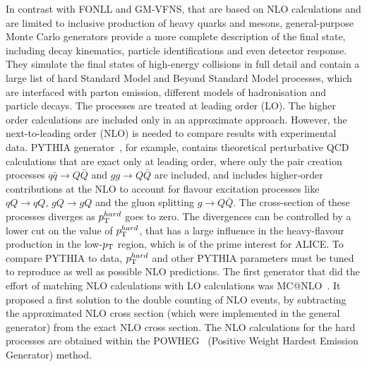 In contrast with FONLL and GM-VFNS, that are based on NLO calculations and are limited to inclusive production
of heavy quarks and mesons, general-purpose Monte Carlo generators provide a more complete description 
of the final state, including decay kinematics, particle identifications and even detector response. They simulate the 
final states of high-energy collisions in full detail and contain a large list of hard Standard Model and Beyond Standard Model processes, which are interfaced with parton emission, different models of hadronisation and particle decays. 
The processes are treated at leading order (LO). The higher order calculations are included only in an
approximate approach. However, the next-to-leading order (NLO) is needed to compare results with experimental data.
PYTHIA generator~\cite{Sjostrand:2006za}, for example, contains theoretical perturbative QCD calculations that are exact only
at leading order, where only the pair creation processes $q\bar{q} \rightarrow Q\bar{Q}$ and $gg \rightarrow Q\bar{Q}$
are included, and includes higher-order contributions at the NLO to account 
for flavour excitation processes like $qQ \rightarrow qQ$, $gQ \rightarrow gQ$
and the gluon splitting $g \rightarrow Q\bar{Q}$. The cross-section of these processes 
diverges as $p_{\rm T}^{hard}$ goes to zero. The divergences can be controlled by a lower cut 
on the value of  $p_{\rm T}^{hard}$, that has a large influence in the heavy-flavour production 
in the low-$p_{\rm T}$ region, which is of the prime interest for ALICE. To compare PYTHIA to data, $p_{\rm T}^{hard}$ and
other PYTHIA parameters must be tuned to reproduce as well as possible NLO predictions.
The first generator that did the effort of matching NLO calculations with LO calculations was MC@NLO~\cite{Frixione:2002ik}.
It proposed a first solution to the double counting of NLO events, by subtracting the approximated 
NLO cross section (which were implemented in the general generator) from the exact NLO cross section.
The NLO calculations for the hard processes are obtained within the POWHEG~\cite{Frixione:2007nw} (Positive Weight Hardest Emission Generator) method. 

